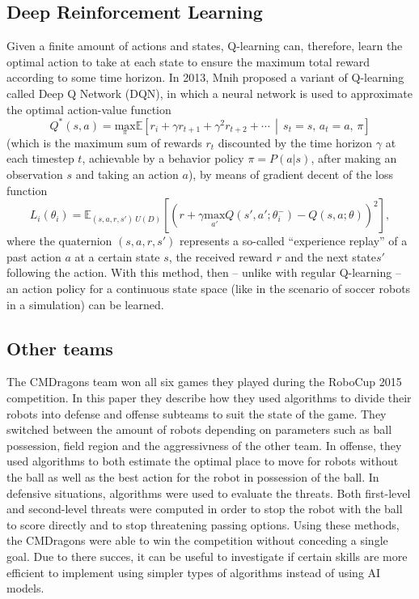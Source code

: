 \subsection{Deep Reinforcement Learning}
Given a finite amount of actions and states, Q-learning can, therefore, learn the optimal action to take at each state to ensure the maximum total reward according to some time horizon. In 2013, Mnih\cite{DQN} proposed a variant of Q-learning called Deep Q Network (DQN), in which a neural network is used to approximate the optimal action-value function
\[
    Q^*(s,a)=\underset \pi {\text{max}} \mathbb{E}\left[ r_i+\gamma r_{t+1}+\gamma^2 r_{t+2}+\cdots \,\middle|\, s_t=s,\,a_t=a,\,\pi \right]
\]
(which is the maximum sum of rewards \(r_t\) discounted by the time horizon \(\gamma\) at each timestep \(t\), achievable by a behavior policy \(\pi=P(a|s)\), after making an observation \(s\) and taking an action \(a\)), by means of gradient decent of the loss function
\[
L_i(\theta_i)=\mathbb{E}_{(s,a,r,s')~U(D)}\left[\left(r+ \gamma \underset {a'} {\text{max}} Q(s',a';\theta^-_i)-Q(s,a;\theta)\right)^2\right]
,\]
where the quaternion \((s,a,r,s')\) represents a so-called ``experience replay'' of a past action \(a\) at a certain state \(s\), the received reward \(r\) and the next state\(s'\) following the action. With this method, then -- unlike with regular Q-learning -- an action policy for a continuous state space (like in the scenario of soccer robots in a simulation) can be learned.

\subsection{Other teams}
The CMDragons team won all six games they played during the RoboCup 2015 competition. In this paper they 
describe how they used algorithms to divide their robots into defense and offense subteams to suit the state 
of the game. They switched between the amount of robots depending on parameters such as ball possession, 
field region and the aggressivness of the other team. In offense, they used algorithms to both estimate the 
optimal place to move for robots without the ball as well as the best action for the robot in possession of the 
ball. In defensive situations, algorithms were used to evaluate the threats. Both first-level and second-level 
threats were computed in order to stop the robot with the ball to score directly and to stop threatening passing 
options. Using these methods, the CMDragons were able to win the competition without conceding a single goal\cite{CMDragons2015}.
Due to there succes, it can be useful to investigate if certain skills are more efficient to implement using simpler
types of algorithms instead of using AI models. 
